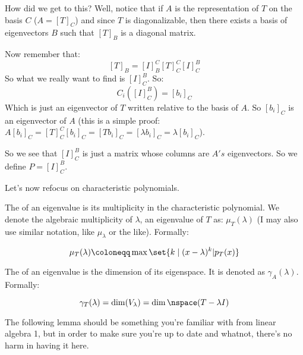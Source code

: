 \documentclass[10pt]{article}
\begin{document}
How did we get to this? Well, notice that if $A$ is the representation of $T$ on the basis $C$ ($A=[T]_C$) and since $T$ is diagonalizable, then there exists a basis of eigenvectors $B$ such that $[T]_B$ is a diagonal matrix.

Now remember that:
\[ [T]_B = [I]^C_B [T]^C_C [I]^B_C \]
So what we really want to find is $[I]^B_C$. So:
\[ C_i([I]^B_C) = [b_i]_C \]
Which is just an eigenvector of $T$ written relative to the basis of $A$. So $[b_i]_C$ is an eigenvector of $A$ (this is a simple proof: $A[b_i]_C = [T]^C_C[b_i]_C = [Tb_i]_C = [\lambda b_i]_C = \lambda[b_i]_C$).

So we see that $[I]^B_C$ is just a matrix whose columns are $A's$ eigenvectors. So we define $P=[I]^B_C$.

\bigskip

\noindent Let's now refocus on characteristic polynomials.

\begin{definition}

The  of an eigenvalue is its multiplicity in the characteristic polynomial. We denote the algebraic multiplicity of $\lambda$, an eigenvalue of $T$ as: $\mu_T(\lambda)$ (I may also use similar notation, like $\mu_\lambda$ or the like). Formally:

\[ \mu_T(\lambda) \coloneqq \max\set{k\mid (x-\lambda)^k | p_T(x)} \]

\end{definition}

\begin{definition}

The  of an eigenvalue is the dimension of its eigenspace. It is denoted as $\gamma_A(\lambda)$. Formally:

\[ \gamma_T(\lambda) = \dim(V_\lambda) = \dim\nspace(T-\lambda I) \]

\end{definition}

The following lemma should be something you're familiar with from linear algebra 1, but in order to make sure you're up to date and whatnot, there's no harm in having it here.
\end{document}
